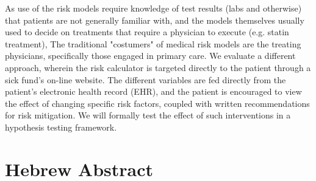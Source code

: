 \documentclass[a4paper,12pt]{article}
\begin{document}
	As use of the risk models require knowledge of test results (labs and otherwise) that patients are not generally familiar with, and the models themselves usually used to decide on treatments that require a physician to execute (e.g. statin treatment), The traditional "costumers" of medical risk models are the treating physicians, specifically those engaged in primary care. We evaluate a different approach, wherein the risk calculator is targeted directly to the patient through a sick fund's on-line website. The different variables are fed directly from the patient's electronic health record (EHR), and the patient is encouraged to view the effect of changing specific risk factors, coupled with written recommendations for risk mitigation. We will formally test the effect of such interventions in a hypothesis testing framework.
	
	\section{Hebrew Abstract}
	
\end{document}

